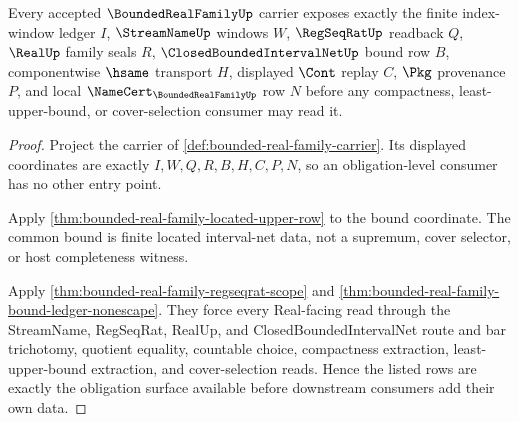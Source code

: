 \begin{theorem}
\label{thm:bounded-real-family-obligation-surface}
Every accepted $\BoundedRealFamilyUp$ carrier exposes exactly the finite index-window ledger $I$, $\StreamNameUp$ windows $W$, $\RegSeqRatUp$ readback $Q$, $\RealUp$ family seals $R$, $\ClosedBoundedIntervalNetUp$ bound row $B$, componentwise $\hsame$ transport $H$, displayed $\Cont$ replay $C$, $\Pkg$ provenance $P$, and local $\NameCert_{\BoundedRealFamilyUp}$ row $N$ before any compactness, least-upper-bound, or cover-selection consumer may read it.
\end{theorem}
\begin{proof}
Project the carrier of \autoref{def:bounded-real-family-carrier}. Its displayed coordinates are exactly $I,W,Q,R,B,H,C,P,N$, so an obligation-level consumer has no other entry point.

Apply \autoref{thm:bounded-real-family-located-upper-row} to the bound coordinate. The common bound is finite located interval-net data, not a supremum, cover selector, or host completeness witness.

Apply \autoref{thm:bounded-real-family-regseqrat-scope} and \autoref{thm:bounded-real-family-bound-ledger-nonescape}. They force every Real-facing read through the StreamName, RegSeqRat, RealUp, and ClosedBoundedIntervalNet route and bar trichotomy, quotient equality, countable choice, compactness extraction, least-upper-bound extraction, and cover-selection reads. Hence the listed rows are exactly the obligation surface available before downstream consumers add their own data.
\end{proof}


